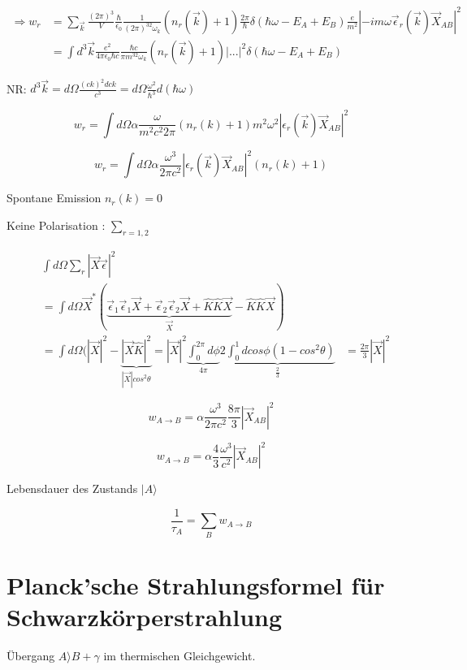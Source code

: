\begin{align}
\Rightarrow w_r &= \sum_{\vec k}\frac{(2\pi)^3}{V} \frac{\hbar}{\epsilon_0}\frac{1}{(2\pi)^32\omega_k}(n_r(\vec k)+1)\frac{2\pi}{\hbar}\delta(\hbar\omega-E_A+E_B)\frac{e}{m^2} |-im\omega\vec\epsilon_r(\vec k)\vec X_{AB}|^2\\
&=\int d^3\vec k\frac{e^2}{4\pi\epsilon_0\hbar c}\frac{\hbar c}{\pi m^32\omega_k}(n_r(\vec k)+1)|...|^2 \delta(\hbar\omega-E_A+E_B)
\end{align}

NR: \(d^3\vec k = d\Omega \frac{(ck)^2 dck}{c^3} = d\Omega \frac{\omega^2}{\hbar^3}d(\hbar\omega)\)



\[w_r = \int d\Omega \alpha \frac{\omega}{m^2c^2 2\pi}(n_r(k) +1) m^2\omega^2|\epsilon_r(\vec k)\vec X_{AB}|^2\]

\[\boxed{w_r = \int d\Omega \alpha \frac{\omega^3}{2\pi c^2} |\epsilon_r(\vec k)\vec X_{AB}|^2 (n_r(k) +1)}\]

Spontane Emission \(n_r(k) = 0\)


Keine Polarisation : \(\sum_{r=1,2}\)

\begin{align}
&\int d\Omega \sum_r|\vec X\vec \epsilon|^2\\
&=\int d\Omega \vec X^*(\underbrace{\vec \epsilon_1\vec \epsilon_1\vec X+\vec \epsilon_2\vec \epsilon_2\vec X +\hat K\hat K\vec X}_{\vec X}-\hat K\hat K\vec X)\\
&=\int d\Omega (|\vec X|^2-\underbrace{|\vec X\hat K|^2}_{|\vec X|cos^2\theta} = |\vec X|^2 \underbrace{\int_0^{2\pi}d\phi}_{4\pi}\underbrace{2\int_0^1dcos\phi(1-cos^2\theta)}_{\frac{2}{3}}
&=\frac{2\pi}{3}|\vec X|^2
\end{align}

\[w_{A\to B}= \alpha \frac{\omega^3}{2\pi c^2}\frac{8\pi}{3}|\vec X_{AB}|^2\]

\[\boxed{w_{A\to B}= \alpha\frac{4}{3} \frac{\omega^3}{c^2}|\vec X_{AB}|^2}\]

Lebensdauer des Zustands \(|A\rangle \)

\[\boxed{\frac{1}{\tau_A} = \sum_B w_{A\to B}}\]


\section{Planck'sche Strahlungsformel für Schwarzkörperstrahlung}


Übergang \(A\rangle B+\gamma\) im thermischen Gleichgewicht. 


